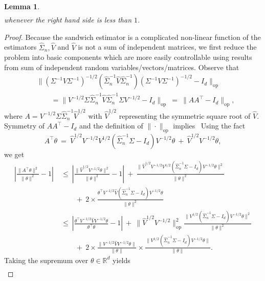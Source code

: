 \documentclass{article}
\newtheorem{lemma}{Lemma}
\begin{document}
\begin{appendices}
\begin{lemma}
\begin{align*}
 \end{align*}
 whenever the right hand side is less than $1$.
 \end{lemma}
 \begin{proof}
 Because the sandwich estimator is a complicated non-linear function of the estimators $\widehat{\Sigma}_n, \widehat{V}$ and $\widehat{V}$ is not a sum of independent matrices, we first reduce the problem into basic components which are more easily controllable using results from sum of independent random variables/vectors/matrices.
 Observe that
 \begin{align*}
 &\|(\Sigma^{-1}V\Sigma^{-1})^{-1/2}(\widehat{\Sigma}_n^{-1}\widehat{V}\widehat{\Sigma}_n^{-1})(\Sigma^{-1}V\Sigma^{-1})^{-1/2} - I_d\|_{\mathrm{op}}\\
 &\qquad= \|V^{-1/2}\Sigma\widehat{\Sigma}_n^{-1}\widehat{V}\widehat{\Sigma}_n^{-1}\Sigma V^{-1/2} - I_d\|_{\mathrm{op}} ~=~ \|AA^{\top} - I_d\|_{\mathrm{op}},
 \end{align*}
 where $A = V^{-1/2}\Sigma\widehat{\Sigma}_n^{-1}\widehat{V}^{1/2}$ with $\widehat{V}^{1/2}$ representing the symmetric square root of $\widehat{V}$. Symmetry of $AA^{\top} - I_d$ and the definition of $\|\cdot\|_{\mathrm{op}}$ implies
 \
 Using the fact $$A^{\top}\theta ~=~ \widehat{V}^{1/2}V^{-1/2}V^{1/2}(\widehat{\Sigma}_n^{-1}\Sigma - I_d)V^{-1/2}\theta ~+~ \widehat{V}^{1/2}V^{-1/2}\theta,$$ we get
 \begin{align*}
 \left|\frac{\|A^{\top}\theta\|^2}{\|\theta\|^2} - 1\right| ~&\le~ \left|\frac{\|\widehat{V}^{1/2}V^{-1/2}\theta\|^2}{\|\theta\|^2} - 1\right| ~+~ \frac{\|\widehat{V}^{1/2}V^{-1/2}V^{1/2}(\widehat{\Sigma}_n^{-1}\Sigma - I_d)V^{-1/2}\theta\|^2}{\|\theta\|^2}\\
 ~&\qquad+~ 2\times\frac{\theta^{\top}V^{-1/2}\widehat{V}(\widehat{\Sigma}_n^{-1}\Sigma - I_d)V^{-1/2}\theta}{\|\theta\|^2}\\
 ~&\le~ \left|\frac{\theta^{\top}V^{-1/2}\widehat{V}V^{-1/2}\theta}{\theta^{\top}\theta} - 1\right| ~+~ \|\widehat{V}^{1/2}V^{-1/2}\|_{\mathrm{op}}^2\frac{\|V^{1/2}(\widehat{\Sigma}_n^{-1}\Sigma - I_d)V^{-1/2}\theta\|^2}{\|\theta\|^2}\\
 ~&\qquad+~ 2\times\frac{\|V^{-1/2}\widehat{V}V^{-1/2}\theta\|}{\|\theta\|}\times\frac{\|V^{1/2}(\widehat{\Sigma}_n^{-1}\Sigma - I_d)V^{-1/2}\theta\|}{\|\theta\|}.
 \end{align*}
 Taking the supremum over $\theta\in\mathbb{R}^d$ yields
 \begin{equation}\label{eq:main-inequality-sandwich}
 \begin{split}

\end{split}
\end{equation}
\end{proof}
\end{appendices}
\end{document}
